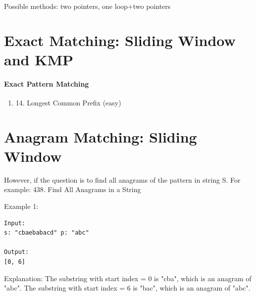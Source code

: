 \documentclass[../main.tex]{subfiles}
\begin{document}
Possible methods: two pointers, one loop$+$two pointers
\section{Exact Matching: Sliding Window and KMP}

\paragraph{Exact Pattern Matching}
\begin{enumerate}
    \item 14. Longest Common Prefix (easy)
\end{enumerate}

\section{Anagram Matching: Sliding Window}
\label{string_anagram}

However, if the question is to find all anagrams of the pattern in string S.
For example: 438. Find All Anagrams in a String

Example 1:
\begin{lstlisting}
Input:
s: "cbaebabacd" p: "abc"

Output:
[0, 6]
\end{lstlisting}

Explanation:
The substring with start index = 0 is "cba", which is an anagram of "abc".
The substring with start index = 6 is "bac", which is an anagram of "abc".
\end{document}
